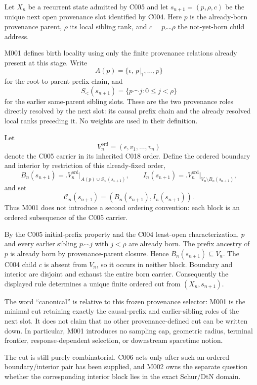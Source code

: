 Let $X_n$ be a recurrent state admitted by C005 and let
$s_{n+1}=(p,\rho,c)$ be the unique next open provenance slot identified by
C004.  Here $p$ is the already-born provenance parent, $\rho$ its local
sibling rank, and $c=p\frown\rho$ the not-yet-born child address.

M001 defines birth locality using only the finite provenance relations
already present at this stage.  Write
\[
A(p)=\{\epsilon,\,p|_1,\ldots,p\}
\]
for the root-to-parent prefix chain, and
\[
S_{<}(s_{n+1})=\{p\frown j:0\le j<\rho\}
\]
for the earlier same-parent sibling slots.  These are the two provenance roles
directly resolved by the next slot: its causal prefix chain and the already
resolved local ranks preceding it.  No weights are used in their definition.

Let
\[
V_n^{\mathrm{ord}}=(\epsilon,v_1,\ldots,v_n)
\]
denote the C005 carrier in its inherited C018 order.  Define the ordered
boundary and interior by restriction of this already-fixed order,
\[
B_n(s_{n+1})
 =\bigl.V_n^{\mathrm{ord}}\bigr|_{A(p)\cup S_{<}(s_{n+1})},
\qquad
I_n(s_{n+1})
 =\bigl.V_n^{\mathrm{ord}}\bigr|_{V_n\setminus B_n(s_{n+1})},
\]
and set
\[
\boxed{\mathcal C_n(s_{n+1})=(B_n(s_{n+1}),I_n(s_{n+1}))}.
\]
Thus M001 does not introduce a second ordering convention: each block is an
ordered subsequence of the C005 carrier.

By the C005 initial-prefix property and the C004 least-open characterization,
$p$ and every earlier sibling $p\frown j$ with $j<\rho$ are already born.  The
prefix ancestry of $p$ is already born by provenance-parent closure.  Hence
$B_n(s_{n+1})\subseteq V_n$.  The C004 child $c$ is absent from $V_n$, so it
occurs in neither block.  Boundary and interior are disjoint and exhaust the
entire born carrier.  Consequently the displayed rule determines a unique
finite ordered cut from $(X_n,s_{n+1})$.

The word ``canonical'' is relative to this frozen provenance selector: M001 is
the minimal cut retaining exactly the causal-prefix and earlier-sibling roles
of the next slot.  It does not claim that no other provenance-defined cut can
be written down.  In particular, M001 introduces no sampling cap, geometric
radius, terminal frontier, response-dependent selection, or downstream
spacetime notion.

The cut is still purely combinatorial.  C006 acts only after such an
ordered boundary/interior pair has been supplied, and M002 owns the
separate question whether the corresponding interior block lies in the exact
Schur/DtN domain.

